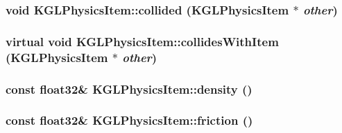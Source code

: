 \begin{CompactItemize}
\hypertarget{class_k_g_l_physics_item_839c757a057b738d58f315ea821a81a0}{
\subsubsection[{collided}]{\setlength{\rightskip}{0pt plus 5cm}void KGLPhysicsItem::collided ({\bf KGLPhysicsItem} $\ast$ {\em other})}}
\label{class_k_g_l_physics_item_839c757a057b738d58f315ea821a81a0}


\hypertarget{class_k_g_l_physics_item_e531b03571d9d7bc17a76bbf9fbc2d8a}{
\subsubsection[{collidesWithItem}]{\setlength{\rightskip}{0pt plus 5cm}virtual void KGLPhysicsItem::collidesWithItem ({\bf KGLPhysicsItem} $\ast$ {\em other})}}
\label{class_k_g_l_physics_item_e531b03571d9d7bc17a76bbf9fbc2d8a}


\hypertarget{class_k_g_l_physics_item_c908866d9a749e6bce529b6e4f3ed80b}{
\subsubsection[{density}]{\setlength{\rightskip}{0pt plus 5cm}const float32\& KGLPhysicsItem::density ()}}
\label{class_k_g_l_physics_item_c908866d9a749e6bce529b6e4f3ed80b}


\hypertarget{class_k_g_l_physics_item_656cc790aa2b53f3c45e4488aad35887}{
\subsubsection[{friction}]{\setlength{\rightskip}{0pt plus 5cm}const float32\& KGLPhysicsItem::friction ()}}
\label{class_k_g_l_physics_item_656cc790aa2b53f3c45e4488aad35887}



\end{CompactItemize}
